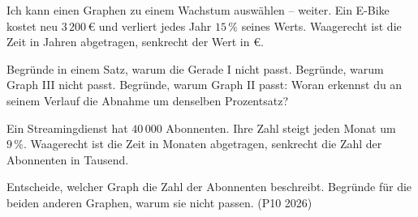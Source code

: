\begin{aufgabe}{Ich kann einen Graphen zu einem Wachstum auswählen – weiter. Ein E-Bike kostet neu $3\,200\,€$ und verliert jedes Jahr $15\,\%$ seines Werts. Waagerecht ist die Zeit in Jahren abgetragen, senkrecht der Wert in €.}

\begin{ksys}[xmin=0,xmax=6,ymin=0,ymax=3600,ystep=600,ablesen]
\end{ksys}\hspace{0.6cm}\begin{ksys}[xmin=0,xmax=6,ymin=0,ymax=3600,ystep=600,ablesen]
\end{ksys}\hspace{0.6cm}\begin{ksys}[xmin=0,xmax=6,ymin=0,ymax=3600,ystep=600,ablesen]
\end{ksys}

\begin{teile}
\teil Begründe in einem Satz, warum die Gerade I nicht passt.
\teil Begründe, warum Graph III nicht passt.
\teil Begründe, warum Graph II passt: Woran erkennst du an seinem Verlauf die Abnahme um denselben Prozentsatz?
\end{teile}
Ein Streamingdienst hat $40\,000$ Abonnenten. Ihre Zahl steigt jeden Monat um $9\,\%$. Waagerecht ist die Zeit in Monaten abgetragen, senkrecht die Zahl der Abonnenten in Tausend.

\begin{ksys}[xmin=0,xmax=6,ymin=0,ymax=80,ystep=10,ablesen]
\end{ksys}\hspace{0.6cm}\begin{ksys}[xmin=0,xmax=6,ymin=0,ymax=80,ystep=10,ablesen]
\end{ksys}\hspace{0.6cm}\begin{ksys}[xmin=0,xmax=6,ymin=0,ymax=80,ystep=10,ablesen]
\end{ksys}

\begin{teile}
\teil Entscheide, welcher Graph die Zahl der Abonnenten beschreibt. Begründe für die beiden anderen Graphen, warum sie nicht passen. (P10 2026)
\end{teile}
\end{aufgabe}

